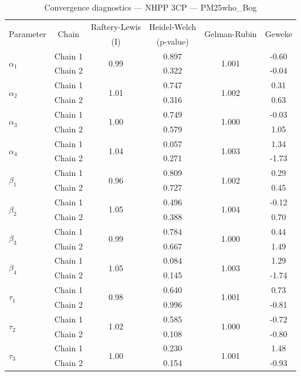 \begin{table}[H]
\centering
\caption{Convergence diagnostics — NHPP 3CP — PM25who_Bog}
\begin{tabular}{lccccc}
\toprule
\multirow{2}{*}{Parameter} & \multirow{2}{*}{Chain} & Raftery-Lewis & Heidel-Welch & \multirow{2}{*}{Gelman-Rubin} & \multirow{2}{*}{Geweke} \\
 & & (I) & (p-value) & & (z) \\
\midrule
\multirow{2}{*}{$\alpha_1$} & Chain 1 & \multirow{2}{*}{0.99} & 0.897 & \multirow{2}{*}{1.001} & -0.60 \\
 & Chain 2 & & 0.322 & & -0.04 \\
\multirow{2}{*}{$\alpha_2$} & Chain 1 & \multirow{2}{*}{1.01} & 0.747 & \multirow{2}{*}{1.002} & 0.31 \\
 & Chain 2 & & 0.316 & & 0.63 \\
\multirow{2}{*}{$\alpha_3$} & Chain 1 & \multirow{2}{*}{1.00} & 0.749 & \multirow{2}{*}{1.000} & -0.03 \\
 & Chain 2 & & 0.579 & & 1.05 \\
\multirow{2}{*}{$\alpha_4$} & Chain 1 & \multirow{2}{*}{1.04} & 0.057 & \multirow{2}{*}{1.003} & 1.34 \\
 & Chain 2 & & 0.271 & & -1.73 \\
\midrule
\multirow{2}{*}{$\beta_1$} & Chain 1 & \multirow{2}{*}{0.96} & 0.809 & \multirow{2}{*}{1.002} & 0.29 \\
 & Chain 2 & & 0.727 & & 0.45 \\
\multirow{2}{*}{$\beta_2$} & Chain 1 & \multirow{2}{*}{1.05} & 0.496 & \multirow{2}{*}{1.004} & -0.12 \\
 & Chain 2 & & 0.388 & & 0.70 \\
\multirow{2}{*}{$\beta_3$} & Chain 1 & \multirow{2}{*}{0.99} & 0.784 & \multirow{2}{*}{1.000} & 0.44 \\
 & Chain 2 & & 0.667 & & 1.49 \\
\multirow{2}{*}{$\beta_4$} & Chain 1 & \multirow{2}{*}{1.05} & 0.084 & \multirow{2}{*}{1.003} & 1.29 \\
 & Chain 2 & & 0.145 & & -1.74 \\
\midrule
\multirow{2}{*}{$\tau_1$} & Chain 1 & \multirow{2}{*}{0.98} & 0.640 & \multirow{2}{*}{1.001} & 0.73 \\
 & Chain 2 & & 0.996 & & -0.81 \\
\multirow{2}{*}{$\tau_2$} & Chain 1 & \multirow{2}{*}{1.02} & 0.585 & \multirow{2}{*}{1.000} & -0.72 \\
 & Chain 2 & & 0.108 & & -0.80 \\
\multirow{2}{*}{$\tau_3$} & Chain 1 & \multirow{2}{*}{1.00} & 0.230 & \multirow{2}{*}{1.001} & 1.48 \\
 & Chain 2 & & 0.154 & & -0.93 \\
\bottomrule
\end{tabular}
\end{table}
